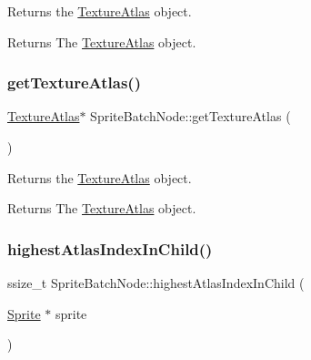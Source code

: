 Returns the \hyperlink{classTextureAtlas}{Texture\+Atlas} object.

\begin{DoxyReturn}{Returns}
The \hyperlink{classTextureAtlas}{Texture\+Atlas} object. 
\end{DoxyReturn}
\mbox{\label{classSpriteBatchNode_ad6a2949d1af5b70038158ae0a6c84fff}} 
\subsubsection{\texorpdfstring{get\+Texture\+Atlas()}{getTextureAtlas()}\hspace{0.1cm}{\footnotesize\ttfamily [2/2]}}
{\footnotesize\ttfamily \hyperlink{classTextureAtlas}{Texture\+Atlas}$\ast$ Sprite\+Batch\+Node\+::get\+Texture\+Atlas (\begin{DoxyParamCaption}{ }\end{DoxyParamCaption})\hspace{0.3cm}{\ttfamily [inline]}}

Returns the \hyperlink{classTextureAtlas}{Texture\+Atlas} object.

\begin{DoxyReturn}{Returns}
The \hyperlink{classTextureAtlas}{Texture\+Atlas} object. 
\end{DoxyReturn}
\mbox{\label{classSpriteBatchNode_a35d235f36390aea4f98b05f9f883cc76}} 
\subsubsection{\texorpdfstring{highest\+Atlas\+Index\+In\+Child()}{highestAtlasIndexInChild()}\hspace{0.1cm}{\footnotesize\ttfamily [1/2]}}
{\footnotesize\ttfamily ssize\+\_\+t Sprite\+Batch\+Node\+::highest\+Atlas\+Index\+In\+Child (\begin{DoxyParamCaption}\item[{\hyperlink{classSprite}{Sprite} $\ast$}]{sprite }\end{DoxyParamCaption})}

